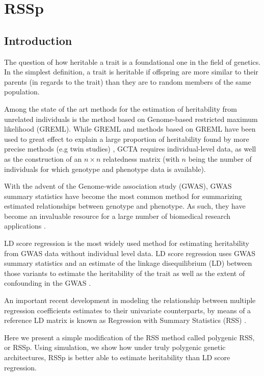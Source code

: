 \chapter{RSSp}



\section{Introduction}\label{sec:org3c6cf58}

The question of how heritable a trait is a foundational one in the field of genetics. In the simplest definition, a trait is heritable if offspring are more similar to their parents (in regards to the trait) than they are to random members of the same population.  

Among the state of the art methods for the estimation of heritability from unrelated individuals is the method based on Genome-based restricted maximum likelihood (GREML)\cite{GCTA}.  While GREML and methods based on GREML have been used to great effect to explain a large proportion of heritability found by more precise methods (e.g twin studies) \cite{GCTA}, GCTA requires individual-level data, as well as the construction of an $n \times n$ relatedness matrix (with $n$ being the number of individuals for which genotype and phenotype data is available).


With the advent of the Genome-wide association study (GWAS), GWAS summary statistics have become the most common method for summarizing estimated relationships between genotype and phenotype.  As such, they have become an invaluable resource for a large number of biomedical research applications \cite{Lyon_2020}.

LD score regression is the most widely used method for estimating heritability from GWAS data without individual level data.  LD score regression uses GWAS summary statistics and an estimate of the linkage disequilibrium (LD) between those variants to estimate the heritability of the trait as well as the extent of confounding in the GWAS \cite{ldsc}.

An important recent development in modeling the relationship between multiple regression coefficients estimates to their univariate counterparts, by means of a reference LD matrix is known as Regression with Summary Statistics (RSS)
\cite{Zhu_2017}.

Here we present a simple modification of the RSS method called polygenic RSS, or RSSp.  Using simulation, we show how under truly polygenic genetic architectures, RSSp is better able to estimate heritability than LD score regression.


